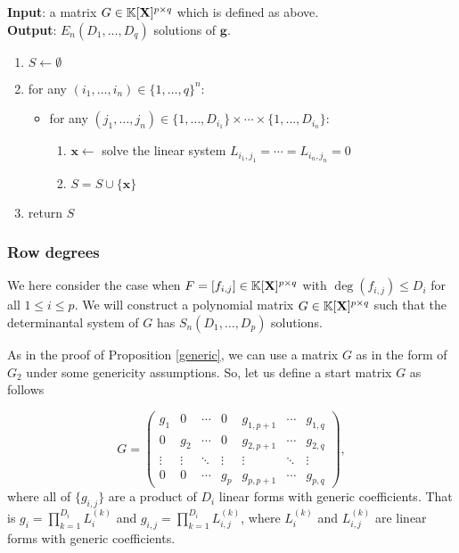 \documentclass[11pt]{article}
\numberwithin{Property}{section}
\numberwithin{Theorem}{section}
\numberwithin{Proposition}{section}
\numberwithin{Lemma}{section}
\numberwithin{Corollary}{section}
\numberwithin{Definition}{section}
\numberwithin{Remark}{section}
\numberwithin{Conjecture}{section}
\numberwithin{Problem}{section}
\numberwithin{Claim}{section}
\theoremstyle{definition}
\numberwithin{Example}{section}
\def\g {\ensuremath{\mathbf{g}}}
\renewcommand{\leq}{\leqslant}
\newcommand{\field}{\mathbb{K}} %
\newcommand{\mat}[1]{\mathbf{\MakeUppercase{#1}}} %
\begin{document}
\begin{algorithm}
\caption{$\mathsf{Start Matrix Column Degrees}$}
\label{StartMatCol}
{\bf Input}: a matrix $G \in \field[\mat{X}]^{p \times q}$ which is defined as above.\\
{\bf Output}: $E_{n}(D_1, \ldots, D_q)$ solutions of $\g$. 

\begin{enumerate}
\item $S \gets \emptyset$
\item for any $(i_1, \ldots, i_{n}) \in \{1, \ldots, q \}^{n}$: 
\begin{itemize}
\item for any $(j_1, \ldots, j_n) \in \{1, \ldots, D_{i_1}\} \times \cdots \times \{1, \ldots, D_{i_n}\} $: 
\begin{enumerate}
\item $\mathbf{x} \gets$ solve the linear system $L_{i_1,j_1} = \cdots = L_{i_n,j_n} = 0$
\item $S = S \cup \{\mathbf{x}\}$
\end{enumerate}
\end{itemize}
\item return $S$
\end{enumerate}
\end{algorithm}
\subsubsection{Row degrees}
We here consider the case when $F = [f_{i,j}] \in \field[\mat{X}]^{p\times q}$ with $\deg({f_{i,j}}) \leq  D_i$ for all $1 \leq i \leq p$. We will construct a polynomial matrix $G \in \field[\mat{X}]^{p \times q}$ such that the determinantal system of $G$ has $S_{n}(D_1, \ldots, D_p)$ solutions. 

As in the proof of Proposition \ref{generic}, we can use a matrix $G$ as in the form of $G_2$ under some genericity assumptions. So, let us define a start matrix $G$ as follows 

\[ G = \left( \begin{matrix}
g_{1} & 0 & \cdots & 0 & g_{1,p+1} & \cdots & g_{1, q}\\
0 & g_{2} & \cdots & 0 & g_{2,p+1} & \cdots & g_{2, q}\\
\vdots & \vdots & \ddots & \vdots & \vdots & \ddots & \vdots\\
0 & 0 & \cdots & g_{p} & g_{p,p+1} & \cdots & g_{p, q}
\end{matrix} \right), \] where all of $\{g_{i,j}\}$ are a product of $D_i$ linear forms with generic coefficients. That is $g_i = \prod_{k=1}^{D_i}L_i^{(k)}$ and $g_{i,j} = \prod_{k=1}^{D_i}L_{i,j}^{(k)}$, where $L_i^{(k)}$ and $L_{i,j}^{(k)}$ are linear forms with generic coefficients. 
\end{document}
